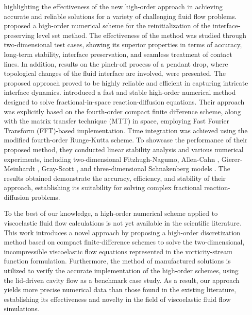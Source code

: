 \documentclass[preprint, 12pt]{elsarticle}
\begin{document}
highlighting the effectiveness of the new high-order approach in achieving accurate and reliable solutions for a variety of challenging fluid flow problems. \citet{ZHANG2019634}  proposed a high-order numerical scheme for the reinitialization of the interface-preserving level set method. The effectiveness of the method was studied through two-dimensional test cases, showing its superior properties in terms of accuracy, long-term stability, interface preservation, and seamless treatment of contact lines. In addition, results on the pinch-off process of a pendant drop, where topological changes of the fluid interface are involved, were presented. The proposed approach proved to be highly reliable and efficient in capturing intricate interface dynamics. \citet{ALMUSHAIRA2021235} introduced a fast and stable high-order numerical method designed to solve fractional-in-space reaction-diffusion equations. Their approach was explicitly based on the fourth-order compact finite difference scheme, along with the matrix transfer technique (MTT) in space, employing Fast Fourier Transform (FFT)-based implementation. Time integration was achieved using the modified fourth-order Runge-Kutta scheme. To showcase the performance of their proposed method, they conducted linear stability analysis and various numerical experiments, including two-dimensional Fitzhugh-Nagumo, Allen-Cahn \citep{Allen1972}, Gierer-Meinhardt \citep{Gierer1972}, Gray-Scott \citep{Gray1984}, and three-dimensional Schnakenberg models \citep{Schnakenberg1979}. The results obtained demonstrate the accuracy, efficiency, and stability of their approach, establishing its suitability for solving complex fractional reaction-diffusion problems.

To the best of our knowledge, a high-order numerical scheme applied to viscoelastic fluid flow calculations is not yet available in the scientific literature. This work introduces a novel approach by proposing a high-order discretization method based on compact finite-difference schemes to solve the two-dimensional, incompressible viscoelastic flow equations represented in the vorticity-stream function formulation. Furthermore, the method of manufactured solutions is utilized to verify the accurate implementation of the high-order schemes, using the lid-driven cavity flow as a benchmark case study. As a result, our approach yields more precise numerical data than those found in the existing literature, establishing its effectiveness and novelty in the field of viscoelastic fluid flow simulations.
\end{document}
